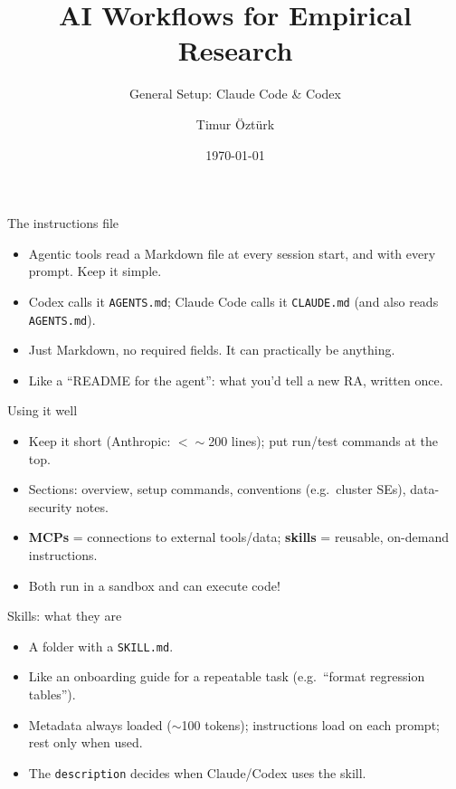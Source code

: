 \documentclass[10pt]{beamer}
\title{AI Workflows for Empirical Research}
\subtitle{General Setup: Claude Code \& Codex}
\author{Timur Öztürk}
\institute{University of Bayreuth}
\date{\today}
\begin{document}
\begin{frame}
  \titlepage
\end{frame}

\begin{frame}{The instructions file}
  \begin{itemize}
    \item Agentic tools read a Markdown file at every session start, and with every prompt. Keep it simple.
    \item Codex calls it \texttt{AGENTS.md}; Claude Code calls
          it \texttt{CLAUDE.md} (and also reads \texttt{AGENTS.md}).
    \item Just Markdown, no required fields. It can practically be anything.
    \item Like a ``README for the agent'': what you'd tell a new RA, written once.
  \end{itemize}
  \vfill
  \href{../sample_agents.md/}{}
  \href{https://code.claude.com/docs/en/memory}{}
\end{frame}

\begin{frame}{Using it well}
  \begin{itemize}
    \item Keep it short (Anthropic: $<\sim$200 lines); put run/test commands at the top.
    \item Sections: overview, setup commands, conventions (e.g.\ cluster SEs),
          data-security notes.
    \item \textbf{MCPs} = connections to external tools/data;
          \textbf{skills} = reusable, on-demand instructions.
    \item Both run in a sandbox and can execute code!
  \end{itemize}
  \vfill
  \href{https://codersera.com/blog/agents-md-complete-guide-2026/}{}\quad
  \href{https://dev.to/nishilbhave/claudemd-best-practices-the-complete-2026-guide-435j}{}\quad
  \href{https://www.agensi.io/learn/codex-cli-agents-md-complete-guide}{}
\end{frame}

\begin{frame}{Skills: what they are}
  \begin{itemize}
    \item A folder with a \texttt{SKILL.md}.
    \item Like an onboarding guide for a repeatable task
          (e.g.\ ``format regression tables'').
    \item Metadata always loaded ($\sim$100 tokens);
          instructions load on each prompt; rest only when used.
    \item The \texttt{description} decides when Claude/Codex uses the skill.
  \end{itemize}
  \vfill
  \href{https://platform.claude.com/docs/en/agents-and-tools/agent-skills/overview}{}
\end{frame}
\end{document}
